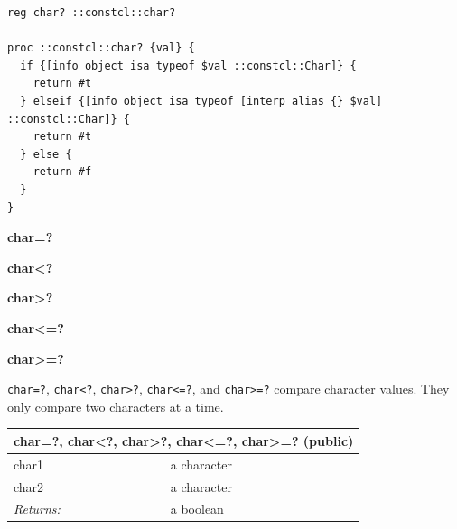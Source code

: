 \documentclass[twoside,9pt]{report}
\begin{document}
\noindent\makebox[\linewidth]{\rule{\linewidth}{0.4pt}}
\begin{lstlisting}
reg char? ::constcl::char?
 
proc ::constcl::char? {val} {
  if {[info object isa typeof $val ::constcl::Char]} {
    return #t
  } elseif {[info object isa typeof [interp alias {} $val] ::constcl::Char]} {
    return #t
  } else {
    return #f
  }
}
\end{lstlisting}
\noindent\makebox[\linewidth]{\rule{\linewidth}{0.4pt}}

\textbf{char=?}


\textbf{char<?}


\textbf{char>?}


\textbf{char<=?}


\textbf{char>=?}


\texttt{char=?}, \texttt{char<?}, \texttt{char>?}, \texttt{char<=?}, and \texttt{char>=?} compare character values. They only compare two characters at a time.

\begin{tabular}{ |l l| }
\hline
\multicolumn{2}{|l|}{char=?, char<?, char>?, char<=?, char>=? (public)} \\
\hline
char1 & a character \\
char2 & a character \\
\textit{Returns:} & a boolean \\
\hline
\end{tabular}
\end{document}
